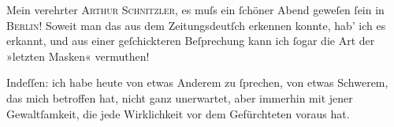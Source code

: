 \pstart{}Mein verehrter \textsc{Arthur Schnitzler},\pend\vspace{0.5em}
\pstart
           es muſs ein{ }ſchöner Abend
               geweſen{ }ſein in \textsc{Berlin}! Soweit man das aus dem
               Zeitungsdeutſch erkennen konnte, hab’ ich es erkannt, und aus einer geſchickteren
               Beſprechung kann ich{ }ſogar die Art der »letzten
                  Masken« vermuthen!\pend
           
\pstart
           Indeſſen: ich habe heute von etwas Anderem zu{ }ſprechen, von etwas Schwerem, das mich
               betroffen hat, nicht ganz unerwartet, aber immerhin mit jener Gewaltſamkeit, die jede
               Wirklichkeit vor dem Gefürchteten voraus hat.\pend
           
